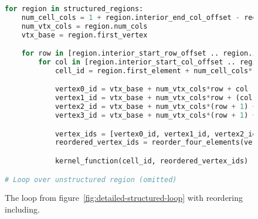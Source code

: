 \begin{figure}
\newsavebox{\structureloopc}
\begin{lrbox}{\structureloopc}
\begin{lstlisting}[language=python]
for region in structured_regions:
	num_cell_cols = 1 + region.interior_end_col_offset - region.interior_end_start_offset
	num_vtx_cols = region.num_cols
	vtx_base = region.first_vertex

	for row in [region.interior_start_row_offset .. region.interior_end_row_offset]:
		for col in [region.interior_start_col_offset .. region.interior_end_col_offset]:
			cell_id = region.first_element + num_cell_cols*row + col

			vertex0_id = vtx_base + num_vtx_cols*row + col
			vertex1_id = vtx_base + num_vtx_cols*row + (col + 1)
			vertex2_id = vtx_base + num_vtx_cols*(row + 1) + col
			vertex3_id = vtx_base + num_vtx_cols*(row + 1) + (col + 1)

			vertex_ids = [vertex0_id, vertex1_id, vertex2_id, vertex3_id]
			reordered_vertex_ids = reorder_four_elements(vertex_ids, region.compass)

			kernel_function(cell_id, reordered_vertex_ids)

# Loop over unstructured region (omitted)
\end{lstlisting}
\end{lrbox}

\usebox{\structureloopc}
\caption{The loop from figure~\ref{fig:detailed-structured-loop} with reordering including.}
\label{fig:final-structured-loop}
\end{figure}
